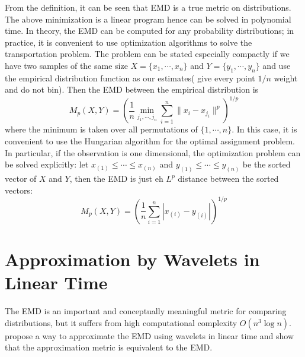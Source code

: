 \documentclass[12pt, reqno]{amsart}
\begin{document}
From the definition, it can be seen that EMD is a true metric on distributions. The above minimization is a linear program hence can be solved in polynomial time. In theory, the EMD can be computed for any probability distributions; in practice, it is convenient to use optimization algorithms to solve the transportation problem. The problem can be stated especially compactly if we have two samples of the same size $X=\{x_1,\cdots, x_n\}$ and $Y=\{y_1,\cdots, y_n\}$ and use the empirical distribution function as our estimates( give every point $1/n$ weight and do not bin). Then the EMD between the empirical distribution is 
\begin{equation}
	M_p(X,Y)=\left(\frac{1}{n} \min_{j_1,\cdots, j_n} \sum_{i=1}^{n} \|x_i - x_{j_i}\|^p\right)^{1/p}
\end{equation}
where the minimum is taken over all permutations of $\{1,\cdots, n\}$. In this case, it is convenient to use the Hungarian algorithm for the optimal assignment problem. In particular, if the observation is one dimensional, the optimization problem can be solved explicitly: let $x_{(1)}\leq \cdots \leq x_{(n)}$ and $y_{(1)}\leq \cdots \leq y_{(n)}$ be the sorted vector of $X$ and $Y$, then the EMD is just eh $L^p$ distance between the sorted vectors:
\begin{equation}
	M_p(X,Y) = \left(\frac{1}{n} \sum_{i=1}^{n} |x_{(i)}-y_{(i)}|\right)^{1/p}
\end{equation}


\section*{Approximation by Wavelets in Linear Time}
The EMD is an important and conceptually meaningful metric for comparing distributions, but it suffers from high computational complexity $O(n^3\log n)$. \cite{sheorey2008car} propose a way to approximate the EMD using wavelets in linear time and show that the approximation metric is equivalent to the EMD.
\end{document}
